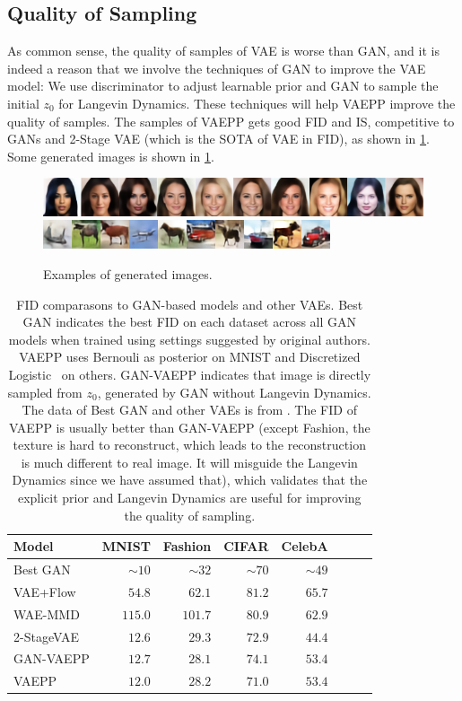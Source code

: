 \subsection{Quality of Sampling}
As common sense, the quality of samples of VAE is worse than GAN, and it is indeed a reason that we involve the techniques of GAN to improve the VAE model: We use discriminator to adjust learnable prior and GAN to sample the initial $z_0$ for Langevin Dynamics. These techniques will help VAEPP improve the quality of samples. The samples of VAEPP gets good FID and IS, competitive to GANs and 2-Stage VAE (which is the SOTA of VAE in FID), as shown in \cref{tab:compare_FID}. Some generated images is shown in \cref{fig:show_images}.
\begin{figure}[tb]
	\centering
	\includegraphics[width=1.0\columnwidth]{../figures/celeba}
	\includegraphics[width=1.0\columnwidth]{../figures/cifar}
	\caption{
		Examples of generated images.
	}
	\label{fig:show_images}
\end{figure}
\begin{table}[tb]
\centering
\begin{tabular}{lrrrrrrr}  
\toprule
Model & MNIST & Fashion & CIFAR & CelebA\\
\midrule
Best GAN   & $\sim10$& $\sim32$&$\sim70$& $\sim49$\\
VAE+Flow   & $54.8$ & $62.1$  & $81.2$ & $65.7$\\
WAE-MMD    & $115.0$ & $101.7$ & $80.9$ & $62.9$\\
2-StageVAE & $12.6$  & $29.3$  & $72.9$ & $44.4$\\
GAN-VAEPP & $12.7$ & $28.1$  & $74.1$  & $53.4$ \\
VAEPP      & $12.0$  & $28.2$  & $71.0$ & $53.4$ \\
\bottomrule
\end{tabular} 
\caption{FID comparasons to GAN-based models and other VAEs. Best GAN indicates the best FID on each dataset across all GAN models when trained using settings suggested by original authors. VAEPP uses Bernouli as posterior on MNIST and Discretized Logistic~\protect\cite{salimans2017pixelcnn++} on others. GAN-VAEPP indicates that image is directly sampled from $z_0$, generated by GAN without Langevin Dynamics. The data of Best GAN and other VAEs is from \protect\cite{dai2019diagnosing}. The FID of VAEPP is usually better than GAN-VAEPP (except Fashion, the texture is hard to reconstruct, which leads to the reconstruction is much different to real image. It will misguide the Langevin Dynamics since we have assumed that), which validates that the explicit prior and Langevin Dynamics are useful for improving the quality of sampling.
}\label{tab:compare_FID}
\end{table}

